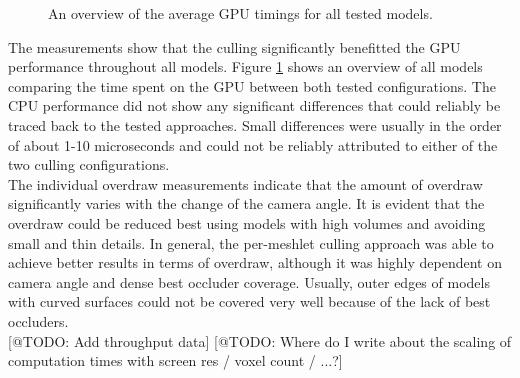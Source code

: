 \begin{figure}    %
  \begin{center}
  \end{center}
  \caption{An overview of the average \ac{GPU} timings for all tested models.}
  \label{fig:gpu-performance-overview}
\end{figure}

\noindent
The measurements show that the culling significantly benefitted the \ac{GPU} performance throughout all 
models. Figure \ref{fig:gpu-performance-overview} shows an overview of all models comparing the time spent 
on the \ac{GPU} between both tested configurations. The \ac{CPU} performance did not show any significant 
differences that could reliably be traced back to the tested approaches. Small differences were usually in the 
order of about 1-10 microseconds and could not be reliably attributed to either of the two culling 
configurations. \\


\noindent
The individual overdraw measurements indicate that the amount of overdraw significantly varies with the 
change of the camera angle. It is evident that the overdraw could be reduced best using models with high 
volumes and avoiding small and thin details. In general, the per-meshlet culling approach was able to 
achieve better results in terms of overdraw, although it was highly dependent on camera angle and dense 
best occluder coverage. Usually, outer edges of models with curved surfaces could not be covered very well 
because of the lack of best occluders. \\



[@TODO: Add throughput data]
[@TODO: Where do I write about the scaling of computation times with screen res / voxel count / ...?]